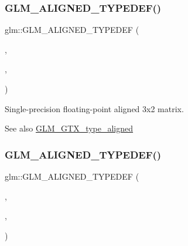 \subsubsection{\texorpdfstring{G\+L\+M\+\_\+\+A\+L\+I\+G\+N\+E\+D\+\_\+\+T\+Y\+P\+E\+D\+E\+F()}{GLM\_ALIGNED\_TYPEDEF()}\hspace{0.1cm}{\footnotesize\ttfamily [175/209]}}
{\footnotesize\ttfamily glm\+::\+G\+L\+M\+\_\+\+A\+L\+I\+G\+N\+E\+D\+\_\+\+T\+Y\+P\+E\+D\+EF (\begin{DoxyParamCaption}\item[{\hyperlink{group__gtc__type__precision_gab194ac1a68dbcb228384112ebe531c67}{fmat3x2}}]{,  }\item[{aligned\+\_\+fmat3x2}]{,  }\item[{16}]{ }\end{DoxyParamCaption})}

Single-\/precision floating-\/point aligned 3x2 matrix. \begin{DoxySeeAlso}{See also}
\hyperlink{group__gtx__type__aligned}{G\+L\+M\+\_\+\+G\+T\+X\+\_\+type\+\_\+aligned} 
\end{DoxySeeAlso}
\mbox{\label{group__gtx__type__aligned_ga27b13f465abc8a40705698145e222c3f}} 
\subsubsection{\texorpdfstring{G\+L\+M\+\_\+\+A\+L\+I\+G\+N\+E\+D\+\_\+\+T\+Y\+P\+E\+D\+E\+F()}{GLM\_ALIGNED\_TYPEDEF()}\hspace{0.1cm}{\footnotesize\ttfamily [176/209]}}
{\footnotesize\ttfamily glm\+::\+G\+L\+M\+\_\+\+A\+L\+I\+G\+N\+E\+D\+\_\+\+T\+Y\+P\+E\+D\+EF (\begin{DoxyParamCaption}\item[{\hyperlink{group__gtc__type__precision_ga577209f19554f5291cc3d66dda9a4388}{fmat3x3}}]{,  }\item[{aligned\+\_\+fmat3x3}]{,  }\item[{16}]{ }\end{DoxyParamCaption})}

